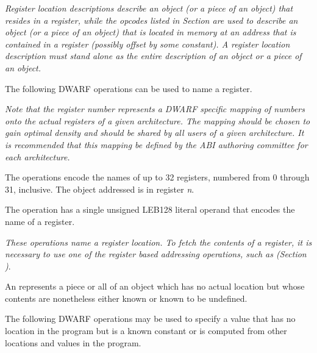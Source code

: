 \textit{Register location descriptions describe an object
(or a piece of an object) that resides in a register, while
the opcodes listed in 
Section 
are used to describe an object (or a piece of
an object) that is located in memory at an address that is
contained in a register (possibly offset by some constant). A
register location description must stand alone as the entire
description of an object or a piece of an object.
}

The following DWARF operations can be used to name a register.


\textit{Note that the register number represents a DWARF specific
mapping of numbers onto the actual registers of a given
architecture. The mapping should be chosen to gain optimal
density and should be shared by all users of a given
architecture. It is recommended that this mapping be defined
by the ABI authoring committee for each architecture.
}
\begin{enumerate}[1. ]
The \DWOPregnTARG{} operations encode the names of up to 32
registers, numbered from 0 through 31, inclusive. The object
addressed is in register \textit{n}.

\itembfnl{\DWOPregxTARG}
The \DWOPregxTARG{} operation has a single unsigned LEB128 literal
operand that encodes the name of a register.  

\end{enumerate}

\textit{These operations name a register location. To
fetch the contents of a register, it is necessary to use
one of the register based addressing operations, such as
\DWOPbregx{} 
(Section )}.

An 
represents a piece or all
of an object which has no actual location but whose contents
are nonetheless either known or known to be undefined.

The following DWARF operations may be used to specify a value
that has no location in the program but is a known constant
or is computed from other locations and values in the program.

